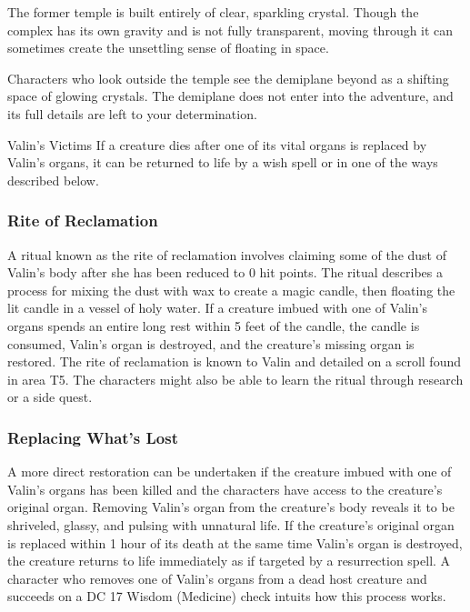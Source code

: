 \documentclass[10pt,a4paper,twoside,bg=print,twocolumn,openany,nodeprecatedcode]{dndbook}
\begin{document}
The former temple is built entirely of clear, sparkling crystal. Though the complex has its own gravity and is not fully transparent, moving through it can sometimes create the unsettling sense of floating in space.

Characters who look outside the temple see the demiplane beyond as a shifting space of glowing crystals. The demiplane does not enter into the adventure, and its full details are left to your determination.

\begin{DndSidebar}[float=!b]{Valin's Victims}
If a creature dies after one of its vital organs is replaced by Valin's organs, it can be returned to life by a wish spell or in one of the ways described below.



\subsubsection{Rite of Reclamation}
A ritual known as the rite of reclamation involves claiming some of the dust of Valin's body after she has been reduced to 0 hit points. The ritual describes a process for mixing the dust with wax to create a magic candle, then floating the lit candle in a vessel of holy water. If a creature imbued with one of Valin's organs spends an entire long rest within 5 feet of the candle, the candle is consumed, Valin's organ is destroyed, and the creature's missing organ is restored. The rite of reclamation is known to Valin and detailed on a scroll found in area T5. The characters might also be able to learn the ritual through research or a side quest.



\subsubsection{Replacing What's Lost}
A more direct restoration can be undertaken if the creature imbued with one of Valin's organs has been killed and the characters have access to the creature's original organ. Removing Valin's organ from the creature's body reveals it to be shriveled, glassy, and pulsing with unnatural life. If the creature's original organ is replaced within 1 hour of its death at the same time Valin's organ is destroyed, the creature returns to life immediately as if targeted by a resurrection spell. A character who removes one of Valin's organs from a dead host creature and succeeds on a DC 17 Wisdom (Medicine) check intuits how this process works.



\end{DndSidebar}
\end{document}
